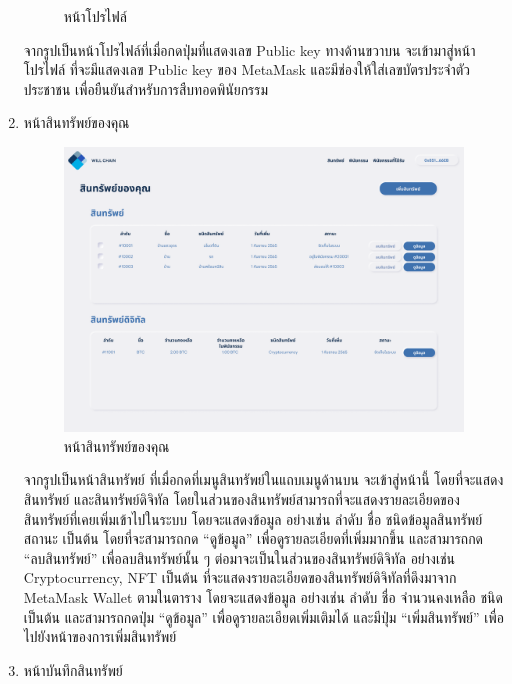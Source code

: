 \documentclass[12pt,oneside,openright,a4paper]{cpe-thai-project}
\begin{document}
\begin{enumerate}[label=\thesubsection.\arabic*,leftmargin=0pt,itemindent=2.5cm]
\begin{figure}[!thb]
			\caption{หน้าโปรไฟล์}
		\end{figure}
		\FloatBarrier
		\tab จากรูปเป็นหน้าโปรไฟล์ที่เมื่อกดปุ่มที่แสดงเลข Public key ทางด้านขวาบน จะเข้ามาสู่หน้าโปรไฟล์ ที่จะมีแสดงเลข Public key ของ MetaMask และมีช่องให้ใส่เลขบัตรประจำตัวประชาชน เพื่อยืนยันสำหรับการสืบทอดพินัยกรรม
		\item หน้าสินทรัพย์ของคุณ
		\begin{figure}[!thb]
			\centering
			\includegraphics[scale=0.25]{userAsset}
			\caption{หน้าสินทรัพย์ของคุณ}
		\end{figure}
		\FloatBarrier
		\tab จากรูปเป็นหน้าสินทรัพย์ ที่เมื่อกดที่เมนูสินทรัพย์ในแถบเมนูด้านบน จะเข้าสู่หน้านี้ โดยที่จะแสดงสินทรัพย์ และสินทรัพย์ดิจิทัล โดยในส่วนของสินทรัพย์สามารถที่จะแสดงรายละเอียดของสินทรัพย์ที่เคยเพิ่มเข้าไปในระบบ โดยจะแสดงข้อมูล อย่างเช่น ลำดับ ชื่อ ชนิดข้อมูลสินทรัพย์ สถานะ เป็นต้น โดยที่จะสามารถกด “ดูข้อมูล” เพื่อดูรายละเอียดที่เพิ่มมากขึ้น และสามารถกด “ลบสินทรัพย์” เพื่อลบสินทรัพย์นั้น ๆ 
ต่อมาจะเป็นในส่วนของสินทรัพย์ดิจิทัล อย่างเช่น Cryptocurrency, NFT เป็นต้น ที่จะแสดงรายละเอียดของสินทรัพย์ดิจิทัลที่ดึงมาจาก MetaMask Wallet ตามในตาราง โดยจะแสดงข้อมูล อย่างเช่น ลำดับ ชื่อ จำนวนคงเหลือ ชนิด เป็นต้น และสามารถกดปุ่ม “ดูข้อมูล” เพื่อดูรายละเอียดเพิ่มเติมได้
และมีปุ่ม “เพิ่มสินทรัพย์” เพื่อไปยังหน้าของการเพิ่มสินทรัพย์
		\item หน้าบันทึกสินทรัพย์
		\begin{figure}[!thb]
			\centering

\end{figure}
\end{enumerate}
\end{document}
